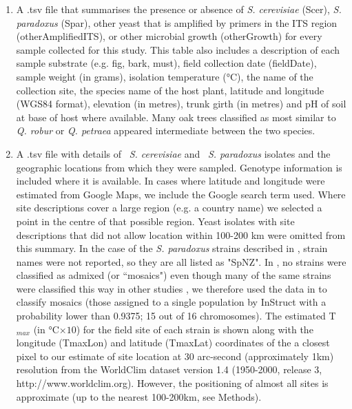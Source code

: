 \documentclass[12pt]{article}
\begin{document}
\begin{enumerate}
\item \label{itm:presabsdata.tsv} A .tsv file that summarises the presence or absence of  \textit{S. cerevisiae} (Scer), \textit{S. paradoxus} (Spar), other yeast that is amplified by primers in the ITS region (otherAmplifiedITS), or other microbial growth (otherGrowth) for every sample collected for this study. This table also includes a description of each sample substrate (e.g. fig, bark, must), field collection date (fieldDate), sample weight (in grams), isolation temperature (\si{\degreeCelsius}), the name of the collection site, the species name of the host plant, latitude and longitude (WGS84 format), elevation (in metres), trunk girth (in metres) and pH of soil at base of host where available. Many oak trees classified as most similar to \textit{Q. robur} or \textit{Q. petraea} appeared intermediate between the two species.

\item \label{itm:manystudies.tsv} A .tsv file with details of \cerinms\  \textit{S. cerevisiae} and \parinms\ \textit{S. paradoxus} isolates and the geographic locations from which they were sampled. Genotype information is included where it is available. In cases where latitude and longitude were estimated from Google Maps, we include the Google search term used. Where site descriptions cover a large region (e.g. a country name) we selected a point in the centre of that possible region. Yeast isolates with site descriptions that did not allow location within 100-200 km were omitted from this summary. In the case of the \textit{S. paradoxus} strains described in \citet{zhang_saccharomyces_2010}, strain names were not reported, so they are all listed as "SpNZ". In \citet{cromie_genomic_2013}, no strains were classified as admixed (or ``mosaics") even though many of the same strains were classified this way in other studies \citep{liti_population_2009}, we therefore used the data in \citealp{cromie_genomic_2013} to classify mosaics (those assigned to a single population by InStruct with a probability lower than 0.9375; 15 out of 16 chromosomes). The estimated T$_{max}$ (in \si{\degreeCelsius}$\times10$) for the field site of each strain is shown along with the longitude (TmaxLon) and latitude (TmaxLat) coordinates of the a closest pixel to our estimate of site location at 30 arc-second (approximately 1km) resolution from the WorldClim dataset version 1.4 (1950-2000, release 3, http://www.worldclim.org). However, the positioning of almost all sites is approximate (up to the nearest 100-200km, see Methods).


\end{enumerate}

\clearpage
\end{document}

